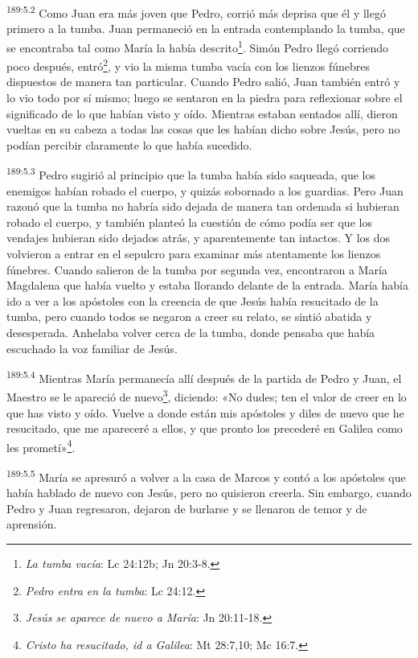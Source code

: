 \par
\textsuperscript{189:5.2} Como Juan era más joven que Pedro, corrió más deprisa que él y llegó primero a la tumba. Juan permaneció en la entrada contemplando la tumba, que se encontraba tal como María la había descrito\footnote{\textit{La tumba vacía}: Lc 24:12b; Jn 20:3-8.}. Simón Pedro llegó corriendo poco después, entró\footnote{\textit{Pedro entra en la tumba}: Lc 24:12.}, y vio la misma tumba vacía con los lienzos fúnebres dispuestos de manera tan particular. Cuando Pedro salió, Juan también entró y lo vio todo por sí mismo; luego se sentaron en la piedra para reflexionar sobre el significado de lo que habían visto y oído. Mientras estaban sentados allí, dieron vueltas en su cabeza a todas las cosas que les habían dicho sobre Jesús, pero no podían percibir claramente lo que había sucedido.

\par
\textsuperscript{189:5.3} Pedro sugirió al principio que la tumba había sido saqueada, que los enemigos habían robado el cuerpo, y quizás sobornado a los guardias. Pero Juan razonó que la tumba no habría sido dejada de manera tan ordenada si hubieran robado el cuerpo, y también planteó la cuestión de cómo podía ser que los vendajes hubieran sido dejados atrás, y aparentemente tan intactos. Y los dos volvieron a entrar en el sepulcro para examinar más atentamente los lienzos fúnebres. Cuando salieron de la tumba por segunda vez, encontraron a María Magdalena que había vuelto y estaba llorando delante de la entrada. María había ido a ver a los apóstoles con la creencia de que Jesús había resucitado de la tumba, pero cuando todos se negaron a creer su relato, se sintió abatida y desesperada. Anhelaba volver cerca de la tumba, donde pensaba que había escuchado la voz familiar de Jesús.

\par
\textsuperscript{189:5.4} Mientras María permanecía allí después de la partida de Pedro y Juan, el Maestro se le apareció de nuevo\footnote{\textit{Jesús se aparece de nuevo a María}: Jn 20:11-18.}, diciendo: «No dudes; ten el valor de creer en lo que has visto y oído. Vuelve a donde están mis apóstoles y diles de nuevo que he resucitado, que me apareceré a ellos, y que pronto los precederé en Galilea como les prometí»\footnote{\textit{Cristo ha resucitado, id a Galilea}: Mt 28:7,10; Mc 16:7.}.

\par
\textsuperscript{189:5.5} María se apresuró a volver a la casa de Marcos y contó a los apóstoles que había hablado de nuevo con Jesús, pero no quisieron creerla. Sin embargo, cuando Pedro y Juan regresaron, dejaron de burlarse y se llenaron de temor y de aprensión.